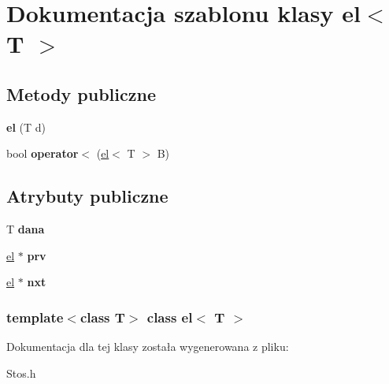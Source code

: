 \hypertarget{classel}{\section{\-Dokumentacja szablonu klasy el$<$ \-T $>$}
\label{classel}
}
\subsection*{\-Metody publiczne}
\begin{DoxyCompactItemize}
\item 
\hypertarget{classel_aa3e5b1b1e8674023f92ad9694c41ae2b}{{\bfseries el} (\-T d)}\label{classel_aa3e5b1b1e8674023f92ad9694c41ae2b}

\item 
\hypertarget{classel_a4b262fcbc2545d96a48dc14ac0e69e99}{bool {\bfseries operator$<$} (\hyperlink{classel}{el}$<$ \-T $>$ \-B)}\label{classel_a4b262fcbc2545d96a48dc14ac0e69e99}

\end{DoxyCompactItemize}
\subsection*{\-Atrybuty publiczne}
\begin{DoxyCompactItemize}
\item 
\hypertarget{classel_aced2827a8e030b5b9d5f857b8f202582}{\-T {\bfseries dana}}\label{classel_aced2827a8e030b5b9d5f857b8f202582}

\item 
\hypertarget{classel_a69d8939dbcd5c7fbb8467263f7000696}{\hyperlink{classel}{el} $\ast$ {\bfseries prv}}\label{classel_a69d8939dbcd5c7fbb8467263f7000696}

\item 
\hypertarget{classel_aa1eac5dfc1ae72aa97ac92db49b4bc05}{\hyperlink{classel}{el} $\ast$ {\bfseries nxt}}\label{classel_aa1eac5dfc1ae72aa97ac92db49b4bc05}

\end{DoxyCompactItemize}
\subsubsection*{template$<$class \-T$>$ class el$<$ T $>$}



\-Dokumentacja dla tej klasy została wygenerowana z pliku\-:\begin{DoxyCompactItemize}
\item 
\-Stos.\-h\end{DoxyCompactItemize}
